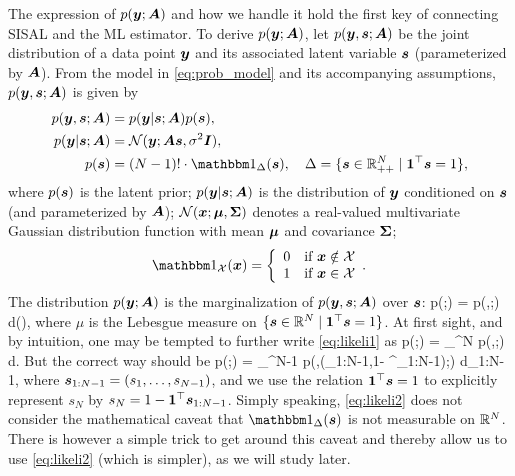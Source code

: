 \documentclass[10pt,twocolumn,twoside]{IEEEtran}
\begin{document}
The expression of $p({\bm y};{\bm A})$ and how we handle it hold the first key of connecting SISAL and the ML estimator.
To derive $p({\bm y};{\bm A})$, let $p({\bm y},{\bm s};{\bm A})$ be the joint distribution of a data point ${\bm y}$ and its associated latent variable ${\bm s}$ (parameterized by ${\bm A}$).
From the model in \eqref{eq:prob_model} and its accompanying assumptions,
$p({\bm y},{\bm s};{\bm A})$ is given by
\begin{align}
p(\by,\bs;\bA) &  = p(\by|\bs;\bA) p(\bs), \\
p(\by|\bs;\bA) &  = \setN(\by; \bA\bs, \sigma^2 \bI),  \\
p(\bs)         &  = (N-1)! \cdot \indfn{\Delta}(\bs), \quad \Delta = \{ \bs \in \Rbb_{++}^N \mid \bone^\top \bs = 1 \},
\end{align}
where $p({\bm s})$ is the latent prior; $p({\bm y}|{\bm s};{\bm A})$ is the distribution of ${\bm y}$ conditioned on ${\bm s}$ (and parameterized by ${\bm A}$);
$\mathcal{N}({\bm x}; {\bm \mu}, {\bm \Sigma} )$ denotes a real-valued multivariate Gaussian distribution function with mean ${\bm \mu}$ and covariance ${\bm \Sigma}$;
\[
\indfn{\setX}(\bx) = \left\{ \begin{array}{ll}
0 & \text{if  $\bx \notin  \setX$} \\
1 & \text{if  $\bx \in  \setX$}
\end{array}.  \right.
\]
The distribution $p({\bm y};{\bm A})$ is the marginalization of $p({\bm y},{\bm s};{\bm A})$ over ${\bm s}$:
\beq \label{eq:likeli1}
p(\by;\bA) = \int p(\by,\bs;\bA) {\rm d}\mu(\bs),
\eeq
where $\mu$ is the Lebesgue measure on $\{ {\bm s} \in \mathbb{R}^N \mid {\bm 1}^\top {\bm s} = 1 \}$.
At first sight, and by intuition, one may be tempted to further write \eqref{eq:likeli1} as
\beq \label{eq:likeli2}
p(\by;\bA) = \int_{\Rbb^N} p(\by,\bs;\bA) {\rm d}\bs.
\eeq
But the correct way should be
\beq
p(\by;\bA) = \int_{\Rbb^{N-1}} p(\by,(\bs_{1:N-1},1- \bone^\top \bs_{1:N-1});\bA) {\rm d}\bs_{1:N-1},
\nonumber
\eeq
where ${\bm s}_{1:N-1}= (s_1,\ldots,s_{N-1})$, and
we use the relation ${\bm 1}^\top {\bm s} = 1$ to explicitly represent $s_N$ by $s_N = 1- {\bm 1}^\top {\bm s}_{1:N-1}$.
Simply speaking, \eqref{eq:likeli2} does not consider the mathematical caveat that $\indfn{\Delta}(\bs)$ is not measurable on $\mathbb{R}^N$.
There is however a simple trick to get around this caveat and thereby allow us to use \eqref{eq:likeli2} (which is simpler), as we will study later.
\end{document}
